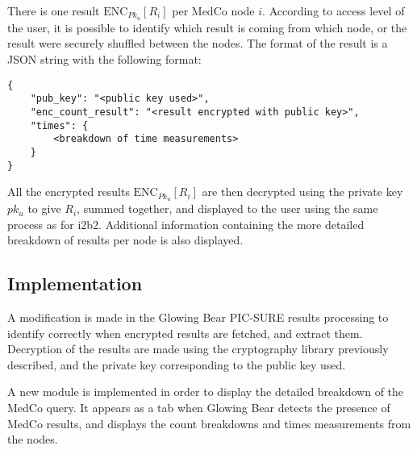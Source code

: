 There is one result $\text{ENC}_{Pk_u}[R_i]$ per MedCo node $i$.
According to access level of the user, it is possible to identify which result is coming from which node, or the result were securely shuffled between the nodes.
The format of the result is a JSON string with the following format:

\begin{verbatim}
{
    "pub_key": "<public key used>",
    "enc_count_result": "<result encrypted with public key>",
    "times": {
        <breakdown of time measurements>
    }
}    
\end{verbatim}

All the encrypted results $\text{ENC}_{Pk_u}[R_i]$ are then decrypted using the private key $pk_u$ to give $R_i$, summed together, and displayed to the user using the same process as for i2b2.
Additional information containing the more detailed breakdown of results per node is also displayed.


\subsection*{Implementation}

A modification is made in the Glowing Bear PIC-SURE results processing to identify correctly when encrypted results are fetched, and extract them.
Decryption of the results are made using the cryptography library previously described, and the private key corresponding to the public key used.

A new module is implemented in order to display the detailed breakdown of the MedCo query.
It appears as a tab when Glowing Bear detects the presence of MedCo results, and displays the count breakdowns and times measurements from the nodes.
